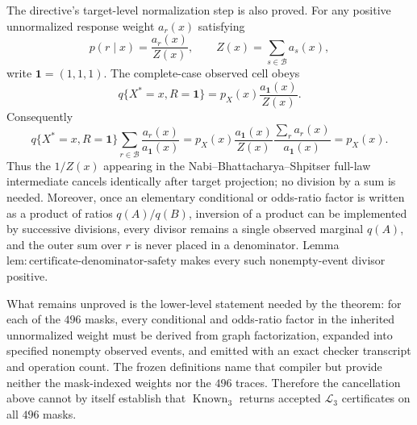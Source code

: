 The directive's target-level normalization step is also proved. For any positive unnormalized response weight \(a_r(x)\) satisfying
\[
p(r\mid x)=\frac{a_r(x)}{Z(x)},\qquad Z(x)=\sum_{s\in\mathcal B}a_s(x),
\]
write \(\mathbf 1=(1,1,1)\). The complete-case observed cell obeys
\[
q\{X^*=x,R=\mathbf1\}=p_X(x)\frac{a_{\mathbf1}(x)}{Z(x)}.
\]
Consequently
\[
q\{X^*=x,R=\mathbf1\}
\sum_{r\in\mathcal B}\frac{a_r(x)}{a_{\mathbf1}(x)}
=p_X(x)\frac{a_{\mathbf1}(x)}{Z(x)}
\frac{\sum_r a_r(x)}{a_{\mathbf1}(x)}
=p_X(x).
\]
Thus the \(1/Z(x)\) appearing in the Nabi--Bhattacharya--Shpitser full-law intermediate cancels identically after target projection; no division by a sum is needed. Moreover, once an elementary conditional or odds-ratio factor is written as a product of ratios \(q(A)/q(B)\), inversion of a product can be implemented by successive divisions, every divisor remains a single observed marginal \(q(A)\), and the outer sum over \(r\) is never placed in a denominator. Lemma \(\mathrm{lem{:}certificate\text{-}denominator\text{-}safety}\) makes every such nonempty-event divisor positive.

What remains unproved is the lower-level statement needed by the theorem: for each of the \(496\) masks, every conditional and odds-ratio factor in the inherited unnormalized weight must be derived from graph factorization, expanded into specified nonempty observed events, and emitted with an exact checker transcript and operation count. The frozen definitions name that compiler but provide neither the mask-indexed weights nor the \(496\) traces. Therefore the cancellation above cannot by itself establish that \(\operatorname{Known}_3\) returns accepted \(\mathcal L_3\) certificates on all \(496\) masks.